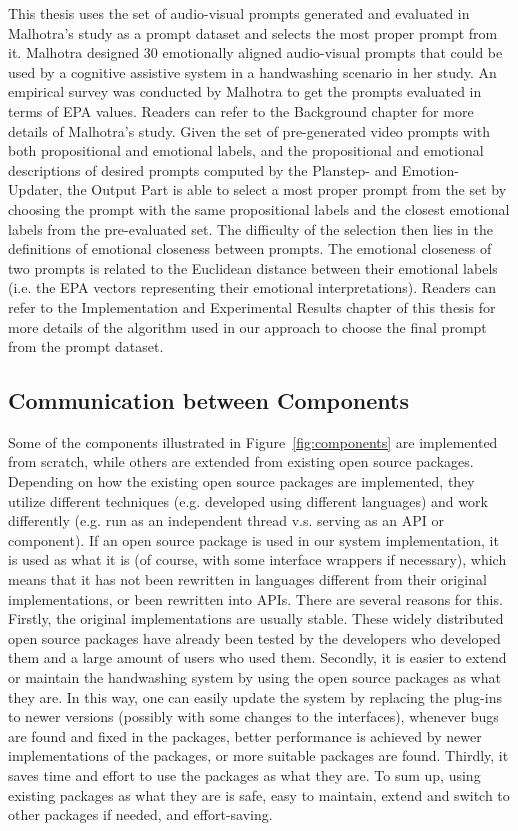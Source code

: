 This thesis uses the set of audio-visual prompts generated and evaluated in Malhotra's study \cite{malhotra2014} as a prompt dataset and selects the most proper prompt from it. Malhotra designed 30 emotionally aligned audio-visual prompts that could be used by a cognitive assistive system in a handwashing scenario in her study. An empirical survey was conducted by Malhotra to get the prompts evaluated in terms of EPA values. Readers can refer to the Background chapter for more details of Malhotra's study. Given the set of pre-generated video prompts with both propositional and emotional labels, and the propositional and emotional descriptions of desired prompts computed by the Planstep- and Emotion- Updater, the Output Part is able to select a most proper prompt from the set by choosing the prompt with the same propositional labels and the closest emotional labels from the pre-evaluated set. The difficulty of the selection then lies in the definitions of emotional closeness between prompts. The emotional closeness of two prompts is related to the Euclidean distance between their emotional labels (i.e. the EPA vectors representing their emotional interpretations). Readers can refer to the Implementation and Experimental Results chapter of this thesis for more details of the algorithm used in our approach to choose the final prompt from the prompt dataset.

\subsection{Communication between Components}

Some of the components illustrated in Figure~\ref{fig:components} are implemented from scratch, while others are extended from existing open source packages. Depending on how the existing open source packages are implemented, they utilize different techniques (e.g. developed using different languages) and work differently (e.g. run as an independent thread v.s. serving as an API or component). If an open source package is used in our system implementation, it is used as what it is (of course, with some interface wrappers if necessary), which means that it has not been rewritten in languages different from their original implementations, or been rewritten into APIs. There are several reasons for this. Firstly, the original implementations are usually stable. These widely distributed open source packages have already been tested by the developers who developed them and a large amount of users who used them. Secondly, it is easier to extend or maintain the handwashing system by using the open source packages as what they are. In this way, one can easily update the system by replacing the plug-ins to newer versions (possibly with some changes to the interfaces), whenever bugs are found and fixed in the packages, better performance is achieved by newer implementations of the packages, or more suitable packages are found. Thirdly, it saves time and effort to use the packages as what they are. To sum up, using existing packages as what they are is safe, easy to maintain, extend and switch to other packages if needed, and effort-saving.

